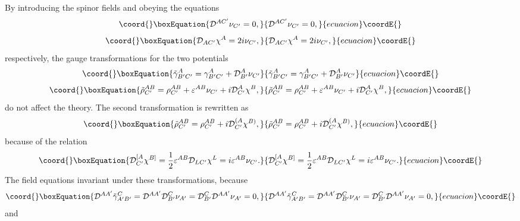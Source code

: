 \documentclass[a4paper,12pt]{article}
\begin{document}
By introducing the spinor fields \coordHE{} and \coordHE{} obeying the equations
\begin{equation}\coord{}\boxEquation{{\cal D}^{AC'}\nu_{C'}=0,}{{\cal D}^{AC'}\nu_{C'}=0,}{ecuacion}\coordE{}\end{equation}
\begin{equation}\coord{}\boxEquation{{\cal D}_{AC'}\chi^A=2i\nu_{C'},}{{\cal D}_{AC'}\chi^A=2i\nu_{C'},}{ecuacion}\coordE{}\end{equation}
respectively, the gauge transformations for the two potentials 
\begin{equation}\coord{}\boxEquation{
\tilde\gamma^A_{B'C'}=\gamma^A_{B'C'}+{\cal D}^A_{B'}\nu_{C'}
}{
\tilde\gamma^A_{B'C'}=\gamma^A_{B'C'}+{\cal D}^A_{B'}\nu_{C'}
}{ecuacion}\coordE{}\end{equation}
\begin{equation}\coord{}\boxEquation{
\tilde\rho^{AB}_{C'}=\rho^{AB}_{C'}+\varepsilon^{AB}\nu_{C'}+i{\cal D}^A_{C'}\chi^B,
}{
\tilde\rho^{AB}_{C'}=\rho^{AB}_{C'}+\varepsilon^{AB}\nu_{C'}+i{\cal D}^A_{C'}\chi^B,
}{ecuacion}\coordE{}\end{equation}
do not affect the theory. 
The second transformation is rewritten as
\begin{equation}\coord{}\boxEquation{
\tilde\rho^{AB}_{C'}=\rho^{AB}_{C'}+i{\cal D}^{(A}_{C'}\chi^{B)},
}{
\tilde\rho^{AB}_{C'}=\rho^{AB}_{C'}+i{\cal D}^{(A}_{C'}\chi^{B)},
}{ecuacion}\coordE{}\end{equation}
because of the relation
\begin{equation}\coord{}\boxEquation{
{\cal D}^{[A}_{C'}\chi^{B]}=\frac{1}{2}\varepsilon^{AB}{\cal D}_{LC'}\chi^L
=i\varepsilon^{AB}\nu_{C'}.
}{
{\cal D}^{[A}_{C'}\chi^{B]}=\frac{1}{2}\varepsilon^{AB}{\cal D}_{LC'}\chi^L
=i\varepsilon^{AB}\nu_{C'}.
}{ecuacion}\coordE{}\end{equation}
The field equations invariant under these transformations, because  
\begin{equation}\coord{}\boxEquation{
{\cal D}^{AA'}\tilde\gamma^C_{A'B'}={\cal D}^{AA'}{\cal D}^C_{B'}\nu_{A'}
={\cal D}^C_{B'}{\cal D}^{AA'}\nu_{A'}=0,
}{
{\cal D}^{AA'}\tilde\gamma^C_{A'B'}={\cal D}^{AA'}{\cal D}^C_{B'}\nu_{A'}
={\cal D}^C_{B'}{\cal D}^{AA'}\nu_{A'}=0,
}{ecuacion}\coordE{}\end{equation}
and
\end{document}
